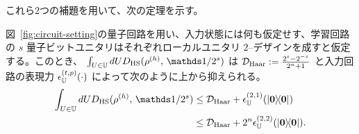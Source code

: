これら2つの補題を用いて、次の定理を示す。
\begin{screen}
    \begin{theorem}\label{thm:qml-var-expressibility}
        図~\ref{fig:circuit-setting}の量子回路を用い、入力状態には何も仮定せす、学習回路の $s$ 量子ビットユニタリはそれぞれローカルユニタリ $2$--デザインを成すと仮定する。このとき、
        $\int_{U\in\bbU}dU D_{\HS} (\rho^{(h)} ,\, \bbid/2^s )$ は
        $\mathcal{D}_{\mathrm{Haar}} := \frac{2^s - 2^{-s}}{2^n+1}$
        と入力回路の表現力 $\epsilon_{\mathbb{U}}^{(t,p)}(\cdot)$ によって次のように上から抑えられる。
        \begin{align}
            \int_{U\in\bbU}dU D_{\HS} (\rho^{(h)} ,\, \bbid/2^s )
            &\leq \calD_{\Haar} + \epsilon_{\bbU}^{(2,1)}(\dyad{\bs{0}})\\
            &\leq \calD_{\Haar} + 2^n\epsilon_{\bbU}^{(2,2)}(\dyad{\bs{0}}).
        \end{align}
    \end{theorem}
\end{screen}


